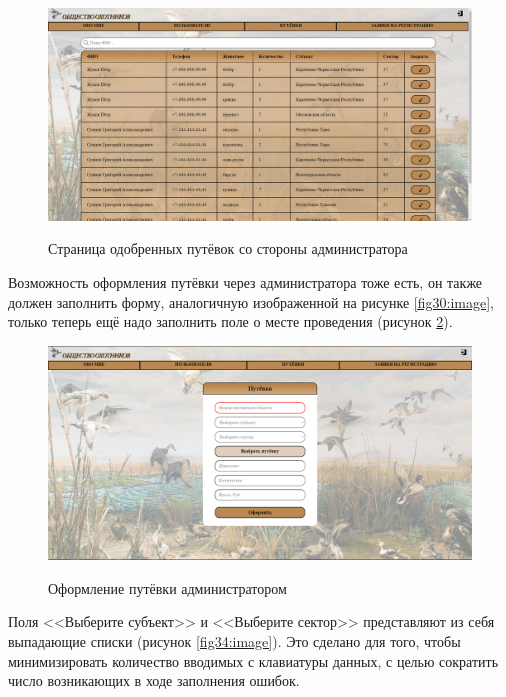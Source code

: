 	\begin{figure}[h!]
		\centering
		\begin{center}
			{\includegraphics[scale=0.34]{schemes/screens/vouchers_admin.png}}
			\caption{Страница одобренных путёвок со стороны администратора}
			\label{fig32:image}
		\end{center}
	\end{figure}
	\newpage

	Возможность оформления путёвки через администратора тоже есть, он также должен заполнить форму, аналогичную изображенной на рисунке \ref{fig30:image}, только теперь  ещё надо заполнить поле о месте проведения (рисунок \ref{fig33:image}).
	
	\begin{figure}[h!]
		\centering
		\begin{center}
			{\includegraphics[scale=0.34]{schemes/screens/create_admin.png}}
			\caption{Оформление путёвки администратором}
			\label{fig33:image}
		\end{center}
	\end{figure}
	\newpage

	Поля <<Выберите субъект>> и <<Выберите сектор>> представляют из себя выпадающие списки (рисунок \ref{fig34:image}). Это сделано для того, чтобы минимизировать количество вводимых с клавиатуры данных, с целью сократить число возникающих в ходе заполнения ошибок.
	
